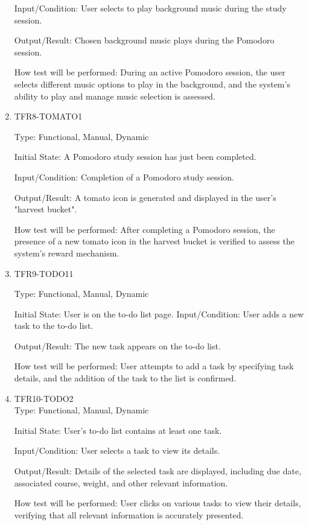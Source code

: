 \documentclass[12pt, titlepage]{article}
\begin{document}
\begin{enumerate}
Input/Condition: User selects to play background music during the study session.

Output/Result: Chosen background music plays during the Pomodoro session.

How test will be performed: During an active Pomodoro session, the user selects different music options to play in the background, and the system's ability to play and manage music selection is assessed.

\item{TFR8-TOMATO1\\}\label{TFR8-TOMATO1}

Type: Functional, Manual, Dynamic

Initial State: A Pomodoro study session has just been completed.

Input/Condition: Completion of a Pomodoro study session.

Output/Result: A tomato icon is generated and displayed in the user's "harvest bucket".

How test will be performed: After completing a Pomodoro session, the presence of a new tomato icon in the harvest bucket is verified to assess the system's reward mechanism.

\item{TFR9-TODO11\\}\label{TFR9-TODO1}

Type: Functional, Manual, Dynamic

Initial State: User is on the to-do list page.
Input/Condition: User adds a new task to the to-do list.

Output/Result: The new task appears on the to-do list.

How test will be performed: User attempts to add a task by specifying task details, and the addition of the task to the list is confirmed.

\item{TFR10-TODO2\\}\label{TFR10-TODO2}
Type: Functional, Manual, Dynamic

Initial State: User's to-do list contains at least one task.

Input/Condition: User selects a task to view its details.

Output/Result: Details of the selected task are displayed, including due date, associated course, weight, and other relevant information.

How test will be performed: User clicks on various tasks to view their details, verifying that all relevant information is accurately presented.



\end{enumerate}
\end{document}

